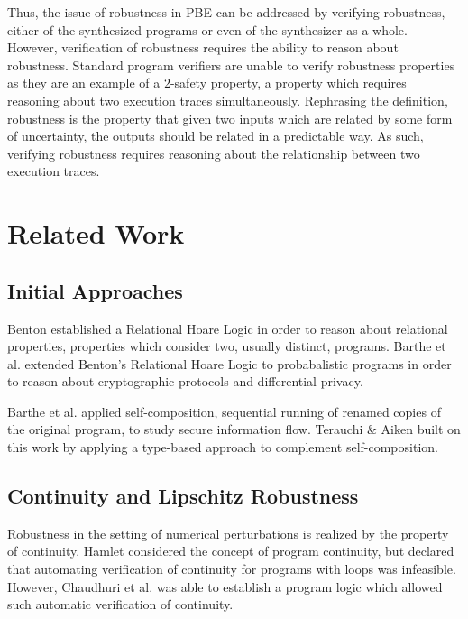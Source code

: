\documentclass{llncs}
\begin{document}
Thus, the issue of robustness in PBE can be addressed by verifying robustness,
either of the synthesized programs or even of the synthesizer as a whole.
However, verification of robustness requires the ability to reason about
robustness.  Standard program verifiers are unable to verify robustness
properties as they are an example of a \(2\)-safety property, a property which
requires reasoning about two execution traces simultaneously.  Rephrasing the definition,
robustness is the property that given two inputs which are related by some form
of uncertainty, the outputs should be related in a predictable way.  As such,
verifying robustness requires reasoning about the relationship between two
execution traces.

\vspace{-0.1in}
\section{Related Work}

  \subsection{Initial Approaches}
    \space\space Benton \cite{benton} established a
    Relational Hoare Logic in order to reason about relational properties,
    properties which consider two, usually distinct, programs.  Barthe et al.
    \cite{barthecrypto,bartheprivacy} extended Benton's Relational Hoare Logic to
    probabalistic programs in order to reason about cryptographic protocols and
    differential privacy.
    \smallskip

    \space\space Barthe et al.
    \cite{barthecomposition} applied self-composition, sequential running of renamed
    copies of the original program, to study secure information flow.  Terauchi \&
    Aiken \cite{terauchi05} built on this work by applying a type-based approach to
    complement self-composition.

    \vspace{-0.1in}
  \subsection{Continuity and Lipschitz Robustness}
    \space\space Robustness in the setting of numerical perturbations
    is realized by the property of continuity.  Hamlet \cite{hamlet02} considered the
    concept of program continuity, but declared that automating verification of
    continuity for programs with loops was infeasible.  However, Chaudhuri et al.
    \cite{chaudhuri10} was able to establish a program logic which allowed such
    automatic verification of continuity.
    \smallskip
\end{document}
